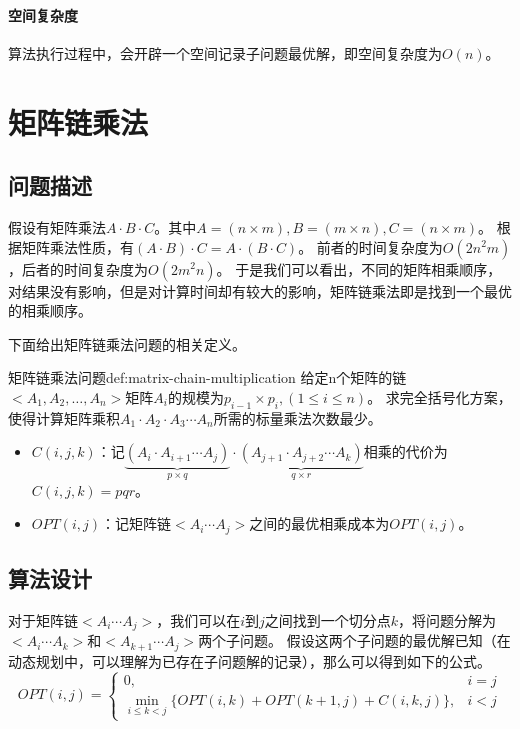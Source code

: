 \paragraph*{空间复杂度}
算法执行过程中，会开辟一个空间记录子问题最优解，即空间复杂度为$O(n)$。

\section{矩阵链乘法}\label{sec:matrix-chain-multiplication}

\subsection{问题描述}
假设有矩阵乘法$A \cdot B \cdot C$。其中$A = (n \times m), B = (m \times n), C = (n \times m)$。
根据矩阵乘法性质，有$(A \cdot B) \cdot C = A \cdot (B \cdot C)$。
前者的时间复杂度为$O(2n^2m)$，后者的时间复杂度为$O(2m^2n)$。
于是我们可以看出，不同的矩阵相乘顺序，对结果没有影响，但是对计算时间却有较大的影响，矩阵链乘法即是找到一个最优的相乘顺序。
\par
下面给出矩阵链乘法问题的相关定义。
\begin{definition}{矩阵链乘法问题}{def:matrix-chain-multiplication}
	给定n个矩阵的链$<A_1,A_2,\ldots,A_n>$矩阵$A_i$的规模为$p_{i-1} \times p_i, (1 \leq i \leq n)$。
	求完全括号化方案，使得计算矩阵乘积$A_1 \cdot A_2 \cdot A_3 \cdots A_n$所需的标量乘法次数最少。
	\begin{itemize}
		\item $C(i,j,k)$：记$\underbrace{(A_i \cdot A_{i+1} \cdots A_j)}_{p \times q}  \cdot \underbrace{(A_{j+1} \cdot A_{j+2} \cdots A_k)}_{q \times r}$相乘的代价为$C(i,j,k)=pqr$。
		\item $OPT(i,j)$：记矩阵链$<A_i \cdots A_j>$之间的最优相乘成本为$OPT(i,j)$。
	\end{itemize}
\end{definition}

\subsection{算法设计}
对于矩阵链$<A_i \cdots A_j>$，我们可以在$i$到$j$之间找到一个切分点$k$，将问题分解为$<A_i \cdots A_k>$和$<A_{k+1} \cdots A_j>$两个子问题。
假设这两个子问题的最优解已知（在动态规划中，可以理解为已存在子问题解的记录），那么可以得到如下的公式。
\begin{equation}
	OPT(i,j) = \begin{cases}
		0,                                                            & i = j \\
		\min\limits_{i \leq k < j} \{ OPT(i,k)+OPT(k+1,j)+C(i,k,j)\}, & i < j
	\end{cases}
\end{equation}

